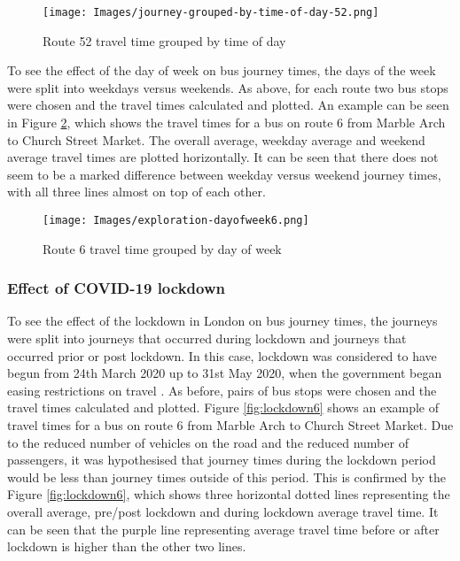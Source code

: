 \begin{figure}[H]
\begin{center}
    \texttt{[image: Images/journey-grouped-by-time-of-day-52.png]}
    \caption{Route 52 travel time grouped by time of day}
    \label{fig:time-of-day-52}
\end{center}
\end{figure}

To see the effect of the day of week on bus journey times, the days of the week were split into weekdays versus weekends. As above, for each route two bus stops were chosen and the travel times calculated and plotted. An example can be seen in Figure \ref{fig:day-of-week6}, which shows the travel times for a bus on route 6 from Marble Arch to Church Street Market. The overall average, weekday average and weekend average travel times are plotted horizontally. It can be seen that there does not seem to be a marked difference between weekday versus weekend journey times, with all three lines almost on top of each other.

\begin{figure}[H]
\begin{center}
    \texttt{[image: Images/exploration-dayofweek6.png]}
    \caption{Route 6 travel time grouped by day of week}
    \label{fig:day-of-week6}
\end{center}
\end{figure}

\subsubsection{Effect of COVID-19 lockdown}

To see the effect of the lockdown in London on bus journey times, the journeys were split into journeys that occurred during lockdown and journeys that occurred prior or post lockdown. In this case, lockdown was considered to have begun from 24th March 2020 up to 31st May 2020, when the government began easing restrictions on travel \cite{lockdown-easing}. As before, pairs of bus stops were chosen and the travel times calculated and plotted. Figure \ref{fig:lockdown6} shows an example of travel times for a bus on route 6 from Marble Arch to Church Street Market. Due to the reduced number of vehicles on the road and the reduced number of passengers, it was hypothesised that journey times during the lockdown period would be less than journey times outside of this period. This is confirmed by the Figure \ref{fig:lockdown6}, which shows three horizontal dotted lines representing the overall average, pre/post lockdown and during lockdown average travel time. It can be seen that the purple line representing average travel time before or after lockdown is higher than the other two lines.

